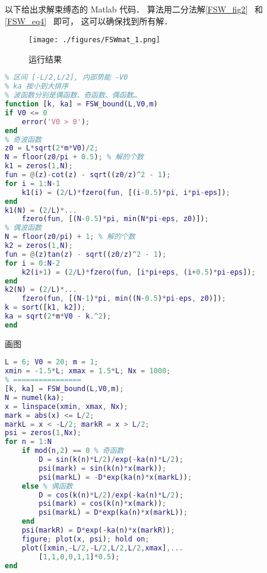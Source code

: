 

以下给出求解束缚态的 Matlab 代码． 算法用二分法解\autoref{FSW_fig2}~ 和\autoref{FSW_eq4}~ 即可， 这可以确保找到所有解．

\begin{figure}[ht]
\centering
\texttt{[image: ./figures/FSWmat\_1.png]}
\caption{运行结果} \label{FSWmat_fig1}
\end{figure}

\begin{lstlisting}[language=matlab, caption=FSW\_bound.m]
% 有限深势阱的束缚态
% 区间 [-L/2,L/2], 内部势能 -V0
% ka 按小到大排序
% 波函数分别是偶函数、奇函数、偶函数…
function [k, ka] = FSW_bound(L,V0,m)
if V0 <= 0
    error('V0 > 0');
end
% 奇波函数
z0 = L*sqrt(2*m*V0)/2;
N = floor(z0/pi + 0.5); % 解的个数
k1 = zeros(1,N);
fun = @(z)-cot(z) - sqrt((z0/z)^2 - 1);
for i = 1:N-1
    k1(i) = (2/L)*fzero(fun, [(i-0.5)*pi, i*pi-eps]);
end
k1(N) = (2/L)*...
    fzero(fun, [(N-0.5)*pi, min(N*pi-eps, z0)]);
% 偶波函数
N = floor(z0/pi) + 1; % 解的个数
k2 = zeros(1,N);
fun = @(z)tan(z) - sqrt((z0/z)^2 - 1);
for i = 0:N-2
    k2(i+1) = (2/L)*fzero(fun, [i*pi+eps, (i+0.5)*pi-eps]);
end
k2(N) = (2/L)*...
    fzero(fun, [(N-1)*pi, min((N-0.5)*pi-eps, z0)]);
k = sort([k1, k2]);
ka = sqrt(2*m*V0 - k.^2);
end
\end{lstlisting}

画图
\begin{lstlisting}[language=matlab, caption=FSW\_bound\_demo.m]
% === 参数设置 ===
L = 6; V0 = 20; m = 1;
xmin = -1.5*L; xmax = 1.5*L; Nx = 1000;
% ================
[k, ka] = FSW_bound(L,V0,m);
N = numel(ka);
x = linspace(xmin, xmax, Nx);
mark = abs(x) <= L/2;
markL = x < -L/2; markR = x > L/2;
psi = zeros(1,Nx);
for n = 1:N
    if mod(n,2) == 0 % 奇函数
        D = sin(k(n)*L/2)/exp(-ka(n)*L/2);
        psi(mark) = sin(k(n)*x(mark));
        psi(markL) = -D*exp(ka(n)*x(markL));
    else % 偶函数
        D = cos(k(n)*L/2)/exp(-ka(n)*L/2);
        psi(mark) = cos(k(n)*x(mark));
        psi(markL) = D*exp(ka(n)*x(markL));
    end
    psi(markR) = D*exp(-ka(n)*x(markR));
    figure; plot(x, psi); hold on;
    plot([xmin,-L/2,-L/2,L/2,L/2,xmax],...
        [1,1,0,0,1,1]*0.5);
end
\end{lstlisting}

